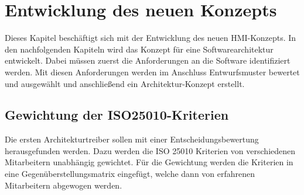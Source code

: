 \section{Entwicklung des neuen Konzepts}\label{hauptabschnitt_3}




Dieses Kapitel beschäftigt sich mit der Entwicklung des neuen \ac{HMI}-Konzepts. In den nachfolgenden Kapiteln wird das Konzept für eine Softwarearchitektur entwickelt. Dabei müssen zuerst die Anforderungen an die Software identifiziert werden. Mit diesen Anforderungen werden im Anschluss Entwurfsmuster bewertet und ausgewählt und anschließend ein Architektur-Konzept erstellt.\\


\subsection{Gewichtung der ISO25010-Kriterien}
\label{Bewertung der ISO25010-Kriterien}
Die ersten Architekturtreiber sollen mit einer Entscheidungsbewertung herausgefunden werden. Dazu werden die ISO 25010 Kriterien von verschiedenen Mitarbeitern unabhängig gewichtet. Für die Gewichtung werden die Kriterien in eine Gegenüberstellungsmatrix eingefügt, welche dann von erfahrenen Mitarbeitern abgewogen werden.\\
  


